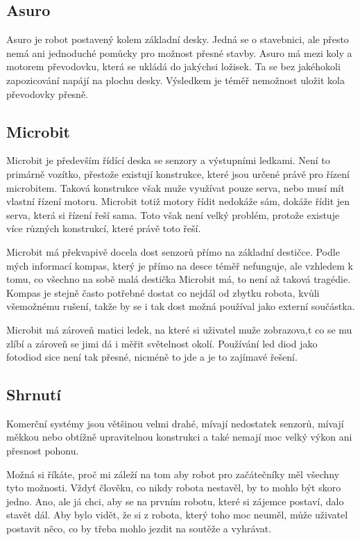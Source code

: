 \documentclass{template/socthesis}
\begin{document}
\subsection{Asuro}
Asuro je robot postavený kolem základní desky. Jedná se o stavebnici, ale přesto nemá ani jednoduché pomůcky pro možnost přesné stavby. Asuro má mezi koly a motorem převodovku, která se ukládá do jakýchsi ložisek. Ta se bez jakéhokoli zapozicování napájí na plochu desky. Výsledkem je téměř nemožnost uložit kola převodovky přesně.


\subsection{Microbit}
Microbit je především řídící deska se senzory a výstupními ledkami. Není to primárně vozítko, přestože existují konstrukce, které jsou určené právě pro řízení microbitem. Taková konstrukce však muže využívat pouze serva, nebo musí mít vlastní řízení motoru. Microbit totiž motory řídit nedokáže sám, dokáže řídit jen serva, která si řízení řeší sama. Toto však není velký problém, protože existuje více různých konstrukcí, které právě toto řeší. 

Microbit má překvapivě docela dost senzorů přímo na základní destičce. Podle mých informací kompas, který je přímo na desce téměř nefunguje, ale vzhledem k tomu, co všechno na sobě malá destička Microbit má, to není až taková tragédie. Kompas je stejně často potřebné dostat co nejdál od zbytku robota, kvůli všemožnému rušení, takže by se i tak dost možná používal jako externí součástka.

Microbit má zároveň matici ledek, na které si uživatel muže zobrazova,t co se mu zlíbí a zároveň se jimi dá i měřit světelnost okolí. Používání led diod jako fotodiod sice není tak přesné, nicméně to jde a je to zajímavé řešení.


\subsection{Shrnutí}
Komerční systémy jsou většinou velmi drahé, mívají nedostatek senzorů, mívají měkkou nebo obtížně upravitelnou konstrukci a také nemají moc velký výkon ani přesnost pohonu.

Možná si říkáte, proč mi záleží na tom aby robot pro začátečníky měl všechny tyto možnosti. Vždyť člověku, co nikdy robota nestavěl, by to mohlo být skoro jedno. Ano, ale já chci, aby se na prvním robotu, které si zájemce postaví, dalo stavět dál. Aby bylo vidět, že si z robota, který toho moc neuměl, může uživatel postavit něco, co by třeba mohlo jezdit na soutěže a vyhrávat. %
\end{document}

